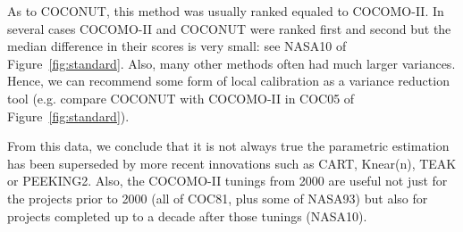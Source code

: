 \documentclass[smallcondesed]{svjour3}
\newcommand{\fig}[1]{Figure~\ref{fig:#1}}
\begin{document}
As to COCONUT, this method
was usually ranked equaled to COCOMO-II.  
In several cases  COCOMO-II and COCONUT were ranked first and second but
the median difference in their scores is very small: see
NASA10 of \fig{standard}.
Also,
many other methods often had much larger variances. 
Hence,  we can recommend some form of local calibration as a variance reduction tool
(e.g. compare COCONUT with COCOMO-II in COC05 of \fig{standard}).


From this data, we conclude that it is not
always true the parametric estimation has been
superseded by more recent innovations such
as CART, Knear(n), TEAK or PEEKING2. Also, the COCOMO-II tunings from 2000
are useful not just for the projects prior to 2000
(all of COC81, plus some of NASA93)
but also for projects completed up to a decade after
those tunings (NASA10).
\end{document}
